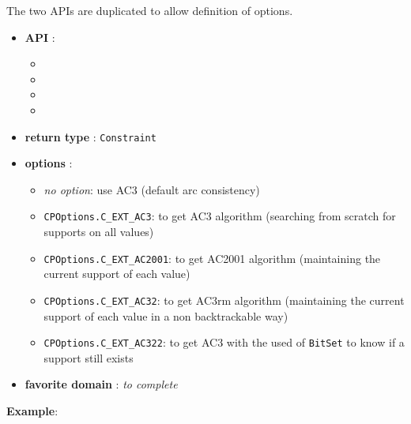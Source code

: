 The two APIs are duplicated to allow definition of options.
\begin{itemize}
	\item \textbf{API} :
	\begin{itemize}
		\item {}
		\item {}
		\item {}
		\item {}
	\end{itemize}
	\item \textbf{return type} : \texttt{Constraint}
	\item \textbf{options} :
	\begin{itemize}
		\item \emph{no option}: use AC3 (default arc consistency)
		\item \texttt{CPOptions.C_EXT_AC3}: to get AC3 algorithm (searching from scratch for supports on all values)
		\item \texttt{CPOptions.C_EXT_AC2001}: to get AC2001 algorithm (maintaining the current support of each value)
		\item \texttt{CPOptions.C_EXT_AC32}: to get AC3rm algorithm (maintaining the current support of each value in a non backtrackable way)
		\item \texttt{CPOptions.C_EXT_AC322}: to get AC3 with the used of \texttt{BitSet} to know if a support still exists
	\end{itemize}
	\item \textbf{favorite domain} : \emph{to complete}
\end{itemize}

\textbf{Example}:

